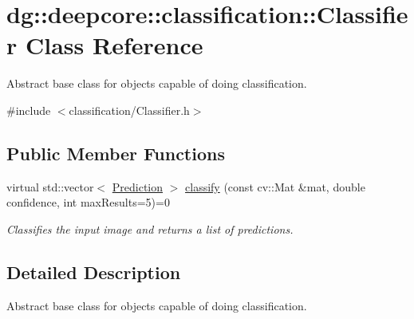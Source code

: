 \hypertarget{classdg_1_1deepcore_1_1classification_1_1_classifier}{}\section{dg\+:\+:deepcore\+:\+:classification\+:\+:Classifier Class Reference}
\label{classdg_1_1deepcore_1_1classification_1_1_classifier}


Abstract base class for objects capable of doing classification.  




{\ttfamily \#include $<$classification/\+Classifier.\+h$>$}

\subsection*{Public Member Functions}
\begin{DoxyCompactItemize}
\item 
virtual std\+::vector$<$ \hyperlink{structdg_1_1deepcore_1_1classification_1_1_prediction}{Prediction} $>$ \hyperlink{group___classification_module_ga4485a5f0dd8fc0b63fb56284ce5a5705}{classify} (const cv\+::\+Mat \&mat, double confidence, int max\+Results=5)=0
\begin{DoxyCompactList}\small\item\em Classifies the input image and returns a list of predictions. \end{DoxyCompactList}\end{DoxyCompactItemize}


\subsection{Detailed Description}
Abstract base class for objects capable of doing classification. 